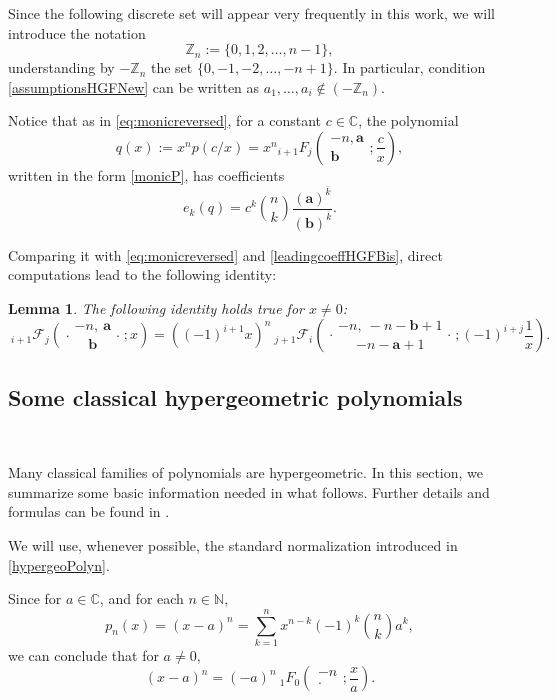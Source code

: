 \documentclass[reqno,11pt]{amsart}
\newtheorem{lemma}[theorem]{Lemma}
\theoremstyle{remark}
\newcommand{\C}{\mathbb{C}}
\newcommand{\Z}{\mathbb{Z}}
\newcommand{\N}{\mathbb{N}}
\newcommand{\raising}[2]{\left(#1\right)^{\overline{#2}}}
\newcommand*\pFq[5]{%
 {\ }_{#1}{\mathcal F}_{#2}{\left(\genfrac..{0pt}{}{#3}{#4};#5\right)}%
}
\begin{document}
Since the following discrete set will appear very frequently in this work, we will introduce the notation
\begin{equation}
    \label{notationZn}
    \Z_n := \{0,  1, 2,\dots,  n-1  \},
\end{equation}
understanding by $-\Z_n$ the set $\{0, -1,-2,\dots, -n+1  \}$. In particular, condition \eqref{assumptionsHGFNew} can be written as $a_1,\dots, a_i \notin \left(- \Z_n\right)$. 

Notice that as in \eqref{eq:monicreversed}, for a constant $c\in \C$, the polynomial
$$q(x):=x^n p(c/x)= x^n {}_{i+1} F_j\left(\begin{matrix} -n, \bm a \\ \bm b
\end{matrix};\frac{c}{x}\right),$$
written in the form \eqref{monicP}, has coefficients  
$$
e_k(q)=c^k \binom{n}{k} \frac{ \raising{\bm a}{k} }{\raising{\bm b}{k} }.
$$ 

Comparing it with \eqref{eq:monicreversed} and \eqref{leadingcoeffHGFBis}, direct computations lead to the following identity:
\begin{lemma}
\label{lem:pFq.reversed}
The following identity holds true for $x\neq 0$:
$$
\pFq{i+1}{j}{-n,\ \bm a}{ \bm b}{x}=
\left((-1)^{i+1} x\right)^n \pFq{j+1}{i}{-n,\ -n -{\bm b} +1}{ -n -{\bm a} +1}{(-1)^{i+j}\frac{1}{x}}.
$$
\end{lemma}


\subsection{Some classical hypergeometric polynomials}\label{sec:classicalHGP}\

Many classical families of polynomials are hypergeometric. In this section, we summarize some basic information needed in what follows. Further details and formulas can be found in \cite{MR2542683, MR2656096, MR2723248, szego1975orthogonal}.

We will use, whenever possible, the standard normalization introduced in \eqref{hypergeoPolyn}.

Since for  $a\in \C$, and for each $n\in \N$, 
$$ 
p_n(x)=(x-a)^n= \sum_{k=1}^n x^{n-k} (-1)^k \binom{n}{k} a^k,
$$ 
we can conclude that for $a\neq 0$,  
\begin{equation}
    \label{Power1F0}
    (x-a)^n= (-a)^n \ {}_1 F_0\left(\begin{matrix} -n \\ \cdot 
\end{matrix}; \frac{x}{a} \right).
\end{equation}
\end{document}
